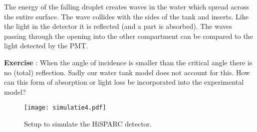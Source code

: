 The energy of the falling droplet creates waves in the water which spread across the entire surface. The wave collides with the sides of the tank and inserts. Like the light in the detector it is reflected (and a part is absorbed). The waves passing through the opening into the other compartment can be compared to the light detected by the PMT.

\begin{shaded}
\textbf{Exercise \theExercise {}} : When the angle of incidence is smaller than the critical angle there is no (total) reflection. Sadly our water tank model does not account for this. How can this form of absorption or light loss be incorporated into the experimental model? \end{shaded}

\begin{figure}[h]\begin{center}
\texttt{[image: simulatie4.pdf]}
\caption{Setup to simulate the HiSPARC detector.}\label{fig:exp_setup}
\end{center}\end{figure}



